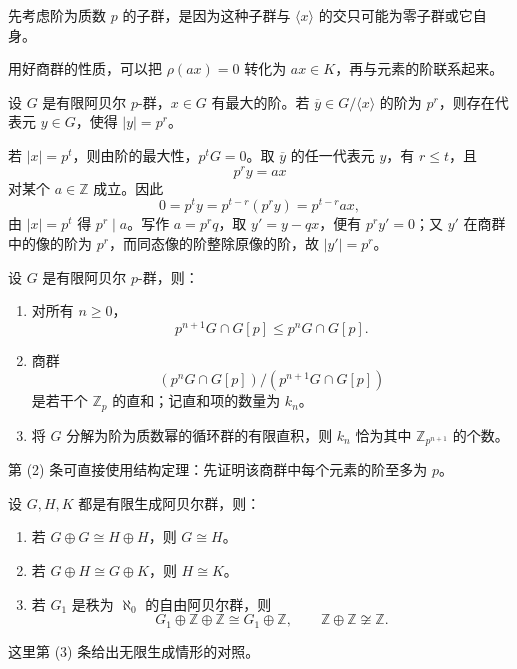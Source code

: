 \begin{purplenote}
先考虑阶为质数 $p$ 的子群，是因为这种子群与 $\langle x\rangle$ 的交只可能为零子群或它自身。

用好商群的性质，可以把 $\rho(ax)=0$ 转化为 $ax\in K$，再与元素的阶联系起来。
\end{purplenote}

\begin{proposition}\label{prop:lift-order-from-maximal-cyclic-quotient}
设 $G$ 是有限阿贝尔 $p$-群，$x\in G$ 有最大的阶。若
$\overline y\in G/\langle x\rangle$ 的阶为 $p^r$，则存在代表元 $y\in G$，使得 $|y|=p^r$。
\end{proposition}

\begin{purplenote}
若 $|x|=p^t$，则由阶的最大性，$p^tG=0$。取 $\overline y$ 的任一代表元 $y$，有 $r\leq t$，且
\[
  p^ry=ax
\]
对某个 $a\in\mathbb Z$ 成立。因此
\[
  0=p^ty=p^{t-r}(p^ry)=p^{t-r}ax,
\]
由 $|x|=p^t$ 得 $p^r\mid a$。写作 $a=p^rq$，取 $y'=y-qx$，便有 $p^ry'=0$；又 $y'$ 在商群中的像的阶为 $p^r$，而同态像的阶整除原像的阶，故 $|y'|=p^r$。
\end{purplenote}

\begin{proposition}\label{prop:finite-abelian-p-group-filtration}
设 $G$ 是有限阿贝尔 $p$-群，则：
\begin{enumerate}[label=(\arabic*)]
  \item 对所有 $n\geq0$，
  \[
    p^{n+1}G\cap G[p]\leq p^nG\cap G[p].
  \]
  \item 商群
  \[
    (p^nG\cap G[p])/(p^{n+1}G\cap G[p])
  \]
  是若干个 $\mathbb Z_p$ 的直和；记直和项的数量为 $k_n$。
  \item 将 $G$ 分解为阶为质数幂的循环群的有限直积，则 $k_n$ 恰为其中 $\mathbb Z_{p^{n+1}}$ 的个数。
\end{enumerate}
\end{proposition}

\begin{purplenote}
第 (2) 条可直接使用结构定理：先证明该商群中每个元素的阶至多为 $p$。
\end{purplenote}

\begin{proposition}\label{prop:fg-abelian-cancellation}
设 $G,H,K$ 都是有限生成阿贝尔群，则：
\begin{enumerate}[label=(\arabic*)]
  \item 若 $G\oplus G\cong H\oplus H$，则 $G\cong H$。
  \item 若 $G\oplus H\cong G\oplus K$，则 $H\cong K$。
  \item 若 $G_1$ 是秩为 $\aleph_0$ 的自由阿贝尔群，则
  \[
    G_1\oplus\mathbb Z\oplus\mathbb Z\cong G_1\oplus\mathbb Z,
    \qquad
    \mathbb Z\oplus\mathbb Z\not\cong\mathbb Z.
  \]
\end{enumerate}
这里第 (3) 条给出无限生成情形的对照。
\end{proposition}

